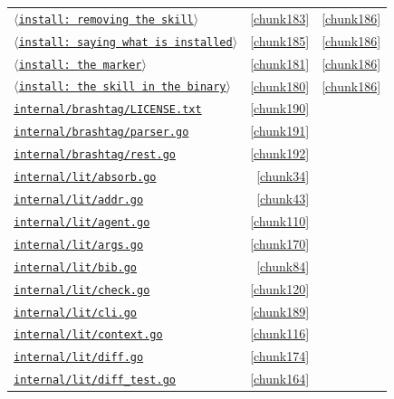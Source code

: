 \documentclass[10pt,a4paper]{article}
\newcounter{chunk}
\newcommand{\chunkname}[1]{\ensuremath{\langle}\texttt{#1}\ensuremath{\rangle}}
\begin{document}
\begin{longtable}{@{}p{}rp{}@{}}
\hyperref[chunk183]{\chunkname{install: removing the skill}} & \ref*{chunk183} & \hyperref[chunk186]{\ref*{chunk186}} \\
\hyperref[chunk185]{\chunkname{install: saying what is installed}} & \ref*{chunk185} & \hyperref[chunk186]{\ref*{chunk186}} \\
\hyperref[chunk181]{\chunkname{install: the marker}} & \ref*{chunk181} & \hyperref[chunk186]{\ref*{chunk186}} \\
\hyperref[chunk180]{\chunkname{install: the skill in the binary}} & \ref*{chunk180} & \hyperref[chunk186]{\ref*{chunk186}} \\
\hyperref[chunk190]{\texttt{internal/\allowbreak{}brashtag/\allowbreak{}LICENSE.\allowbreak{}txt}} & \ref*{chunk190} &  \\
\hyperref[chunk191]{\texttt{internal/\allowbreak{}brashtag/\allowbreak{}parser.\allowbreak{}go}} & \ref*{chunk191} &  \\
\hyperref[chunk192]{\texttt{internal/\allowbreak{}brashtag/\allowbreak{}rest.\allowbreak{}go}} & \ref*{chunk192} &  \\
\hyperref[chunk34]{\texttt{internal/\allowbreak{}lit/\allowbreak{}absorb.\allowbreak{}go}} & \ref*{chunk34} &  \\
\hyperref[chunk43]{\texttt{internal/\allowbreak{}lit/\allowbreak{}addr.\allowbreak{}go}} & \ref*{chunk43} &  \\
\hyperref[chunk110]{\texttt{internal/\allowbreak{}lit/\allowbreak{}agent.\allowbreak{}go}} & \ref*{chunk110} &  \\
\hyperref[chunk170]{\texttt{internal/\allowbreak{}lit/\allowbreak{}args.\allowbreak{}go}} & \ref*{chunk170} &  \\
\hyperref[chunk84]{\texttt{internal/\allowbreak{}lit/\allowbreak{}bib.\allowbreak{}go}} & \ref*{chunk84} &  \\
\hyperref[chunk120]{\texttt{internal/\allowbreak{}lit/\allowbreak{}check.\allowbreak{}go}} & \ref*{chunk120} &  \\
\hyperref[chunk189]{\texttt{internal/\allowbreak{}lit/\allowbreak{}cli.\allowbreak{}go}} & \ref*{chunk189} &  \\
\hyperref[chunk116]{\texttt{internal/\allowbreak{}lit/\allowbreak{}context.\allowbreak{}go}} & \ref*{chunk116} &  \\
\hyperref[chunk174]{\texttt{internal/\allowbreak{}lit/\allowbreak{}diff.\allowbreak{}go}} & \ref*{chunk174} &  \\
\hyperref[chunk164]{\texttt{internal/\allowbreak{}lit/\allowbreak{}diff\_\allowbreak{}test.\allowbreak{}go}} & \ref*{chunk164} &  \\

\end{longtable}
\end{document}
